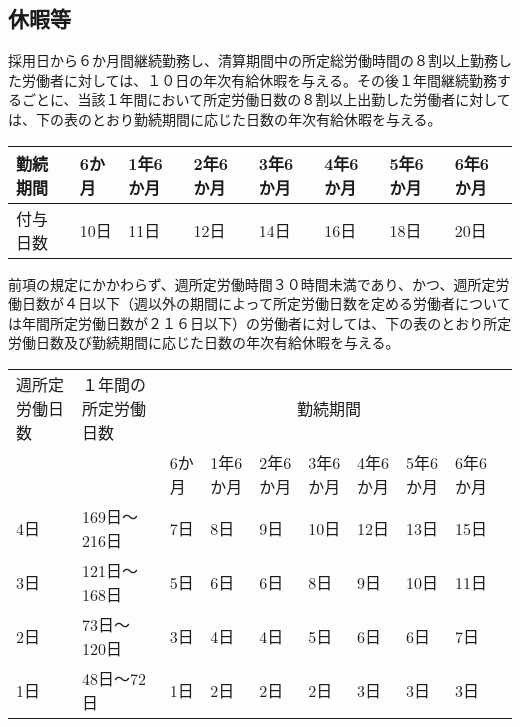 \documentclass[10pt,a4paper,uplatex]{jsarticle}
\begin{document}
\subsection{休暇等}
採用日から６か月間継続勤務し、清算期間中の所定総労働時間の８割以上勤務した労働者に対しては、１０日の年次有給休暇を与える。その後１年間継続勤務するごとに、当該１年間において所定労働日数の８割以上出勤した労働者に対しては、下の表のとおり勤続期間に応じた日数の年次有給休暇を与える。

\hspace{2cm}\begin{tabular}{|l|p{2.5em}|p{2.5em}|p{2.5em}|p{2.5em}|p{2.5em}|p{2.5em}|p{2.5em}|} \hline
  勤続期間 & 6か月 & 1年6か月& 2年6か月& 3年6か月& 4年6か月& 5年6か月& 6年6か月 \\ \hline \hline
  付与日数 & 10日 & 11日& 12日& 14日& 16日& 18日& 20日 \\ \hline
\end{tabular}

\label{para:paid_vacation}
\term
前項の規定にかかわらず、週所定労働時間３０時間未満であり、かつ、週所定労働日数が４日以下（週以外の期間によって所定労働日数を定める労働者については年間所定労働日数が２１６日以下）の労働者に対しては、下の表のとおり所定労働日数及び勤続期間に応じた日数の年次有給休暇を与える。

\hspace{2cm}\begin{tabular}{|p{3em}|p{6.5em}|p{2.5em}|p{2.5em}|p{2.5em}|p{2.5em}|p{2.5em}|p{2.5em}|p{2.5em}|p{2.5em}|} \hline
  週所定労働日数 & １年間の所定労働日数 & \multicolumn{7}{|c|}{勤続期間} \\ \cline{3-9}
  & & 6か月 & 1年6か月& 2年6か月& 3年6か月& 4年6か月& 5年6か月& 6年6か月 \\ \hline \hline
  4日 & 169日～216日 & 7日 & 8日& 9日& 10日& 12日& 13日& 15日 \\ \hline
  3日 & 121日～168日 & 5日 & 6日& 6日&  8日&  9日& 10日& 11日 \\ \hline
  2日 & 73日～120日  & 3日 & 4日& 4日&  5日&  6日&  6日&  7日 \\ \hline
  1日 & 48日～72日   & 1日 & 2日& 2日&  2日&  3日&  3日&  3日 \\ \hline
\end{tabular}
\end{document}
